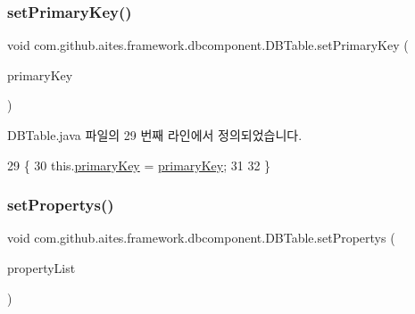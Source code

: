\mbox{\label{classcom_1_1github_1_1aites_1_1framework_1_1dbcomponent_1_1_d_b_table_aa1f8d83d3a13c5899bb7d30a6d1e99bf}} 
\subsubsection{\texorpdfstring{set\+Primary\+Key()}{setPrimaryKey()}}
{\footnotesize\ttfamily void com.\+github.\+aites.\+framework.\+dbcomponent.\+D\+B\+Table.\+set\+Primary\+Key (\begin{DoxyParamCaption}\item[{String}]{primary\+Key }\end{DoxyParamCaption})}



D\+B\+Table.\+java 파일의 29 번째 라인에서 정의되었습니다.


\begin{DoxyCode}
29                                                 \{
30         this.\mbox{\hyperlink{classcom_1_1github_1_1aites_1_1framework_1_1dbcomponent_1_1_d_b_table_a2a972d26ced2f37c2e83625617951e2a}{primaryKey}} = \mbox{\hyperlink{classcom_1_1github_1_1aites_1_1framework_1_1dbcomponent_1_1_d_b_table_a2a972d26ced2f37c2e83625617951e2a}{primaryKey}};
31         
32     \}
\end{DoxyCode}
\mbox{\label{classcom_1_1github_1_1aites_1_1framework_1_1dbcomponent_1_1_d_b_table_ad1eb994a61eb075f7e09938470660b6e}} 
\subsubsection{\texorpdfstring{set\+Propertys()}{setPropertys()}}
{\footnotesize\ttfamily void com.\+github.\+aites.\+framework.\+dbcomponent.\+D\+B\+Table.\+set\+Propertys (\begin{DoxyParamCaption}\item[{Array\+List$<$ \mbox{\hyperlink{classcom_1_1github_1_1aites_1_1framework_1_1dbcomponent_1_1_d_b_property}{D\+B\+Property}} $>$}]{property\+List }\end{DoxyParamCaption})}



